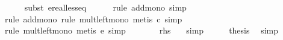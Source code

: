 \begin{isabellebody}
\ \ \ \ \isamarkupfalse%
\ {\isacharparenleft}{\kern0pt}subst\ ereal{\isacharunderscore}{\kern0pt}less{\isacharunderscore}{\kern0pt}eq{\isacharparenright}{\kern0pt}\isanewline
\ \ \ \ \isamarkupfalse%
\ {\isacharparenleft}{\kern0pt}rule\ add{\isacharunderscore}{\kern0pt}mono{\isacharcomma}{\kern0pt}\ simp{\isacharparenright}{\kern0pt}\isanewline
\ \ \ \ \isamarkupfalse%
\ {\isacharparenleft}{\kern0pt}rule\ add{\isacharunderscore}{\kern0pt}mono{\isacharcomma}{\kern0pt}\ rule\ mult{\isacharunderscore}{\kern0pt}left{\isacharunderscore}{\kern0pt}mono{\isacharcomma}{\kern0pt}\ metis\ c{\isacharcomma}{\kern0pt}\ simp{\isacharparenright}{\kern0pt}\isanewline
\ \ \ \ \isamarkupfalse%
\ {\isacharparenleft}{\kern0pt}rule\ mult{\isacharunderscore}{\kern0pt}left{\isacharunderscore}{\kern0pt}mono{\isacharcomma}{\kern0pt}\ metis\ e{\isacharcomma}{\kern0pt}\ simp{\isacharparenright}{\kern0pt}\isanewline
\ \ \isamarkupfalse%
\ \isamarkupfalse%
\ {\isachardoublequoteopen}{\isachardot}{\kern0pt}{\isachardot}{\kern0pt}{\isachardot}{\kern0pt}\ {\isacharequal}{\kern0pt}\ {\isacharquery}{\kern0pt}rhs{\isachardoublequoteclose}\ \ \isamarkupfalse%
\ simp\isanewline
\ \ \isamarkupfalse%
\ \isamarkupfalse%
\ {\isacharquery}{\kern0pt}thesis\ \isamarkupfalse%
\ simp\isanewline
{}\isamarkupfalse%
%
\endisatagproof
{\isafoldproof}%
%
\isadelimproof
\isanewline
%
\endisadelimproof
%
\isadelimtheory
\isanewline
%
\endisadelimtheory
%
\isatagtheory
{}\isamarkupfalse%
%
\endisatagtheory
{\isafoldtheory}%
%
\isadelimtheory
%
\endisadelimtheory
%
\end{isabellebody}%
\endinput
